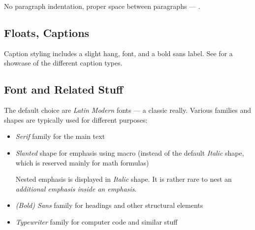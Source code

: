 No paragraph indentation, proper space between paragraphs --- .

\subsection{Floats, Captions}%
\label{sub:Floats_Captions}

Caption styling includes a slight hang, \macro{\footnotesize} font, and a bold sans label.
See  for a showcase of the different caption types.


\subsection{Font and Related Stuff}%
\label{sub:Font}

The default choice are \emph{Latin Modern} fonts --- a classic really.
Various families and shapes are typically used for different purposes:
\begin{itemize}
    \item \emph{Serif} family for the main text
    \item \emph{Slanted} shape for emphasis using \macro{\emph} macro (instead of the default \emph{Italic} shape, which is reserved mainly for math formulas)
          \begin{remark}
              Nested emphasis is displayed in \emph{Italic} shape.
              It is rather rare to nest an \emph{additional \emph{emphasis} inside an emphasis}.
          \end{remark}
    \item \emph{(Bold) Sans} family for headings and other structural elements
    \item \emph{Typewriter} family for computer code and similar stuff
\end{itemize}
\vspace{1ex}

